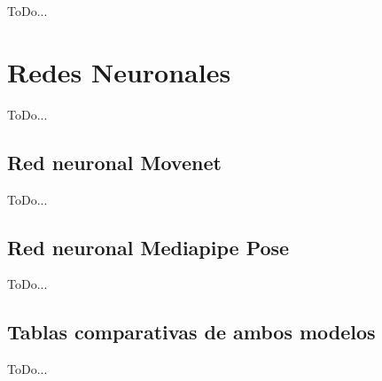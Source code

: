 ToDo...

\section{Redes Neuronales}
\label{sec:redes_neuronales}

ToDo...

\subsection{Red neuronal Movenet}
\label{subsec:movenet}

ToDo...

\subsection{Red neuronal Mediapipe Pose}
\label{subsec:mediapipe}

ToDo...

\subsection{Tablas comparativas de ambos modelos}
\label{subsec:tabla-comparativa-ambos-modelos}

ToDo...